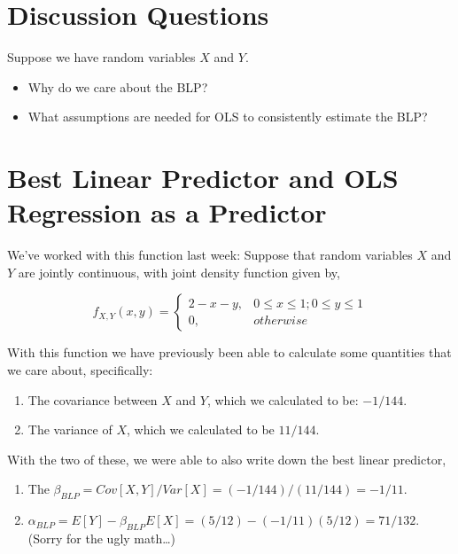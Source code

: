 \documentclass[
  letterpaper,
  DIV=11,
  numbers=noendperiod]{scrreprt}
\providecommand{\tightlist}{%
  \setlength{\itemsep}{0pt}\setlength{\parskip}{0pt}}\usepackage{longtable,booktabs,array}
\begin{document}
\section{Discussion Questions}\label{discussion-questions}

Suppose we have random variables \(X\) and \(Y\).

\begin{itemize}
\tightlist
\item
  Why do we care about the BLP?
\item
  What assumptions are needed for OLS to consistently estimate the BLP?
\end{itemize}

\section{Best Linear Predictor and OLS Regression as a
Predictor}\label{best-linear-predictor-and-ols-regression-as-a-predictor}

We've worked with this function last week: Suppose that random variables
\(X\) and \(Y\) are jointly continuous, with joint density function
given by,

\[
f_{X,Y}(x,y) = 
  \begin{cases}
    2-x-y, & 0 \leq x \leq 1; 0 \leq y \leq 1 \\ 
    0, & otherwise
  \end{cases}
\]

With this function we have previously been able to calculate some
quantities that we care about, specifically:

\begin{enumerate}
\def\labelenumi{\arabic{enumi}.}
\tightlist
\item
  The covariance between \(X\) and \(Y\), which we calculated to be:
  \(-1/144\).
\item
  The variance of \(X\), which we calculated to be \(11/144\).
\end{enumerate}

With the two of these, we were able to also write down the best linear
predictor,

\begin{enumerate}
\def\labelenumi{\arabic{enumi}.}
\setcounter{enumi}{2}
\tightlist
\item
  The \(\beta_{BLP} = Cov[X,Y]/Var[X] = (-1/144) / (11/144) = -1/11\).
\item
  \(\alpha_{BLP} = E[Y] - \beta_{BLP}E[X] = (5/12) - (-1/11)(5/12) = 71/132\).
  (Sorry for the ugly math\ldots)
\end{enumerate}
\end{document}
